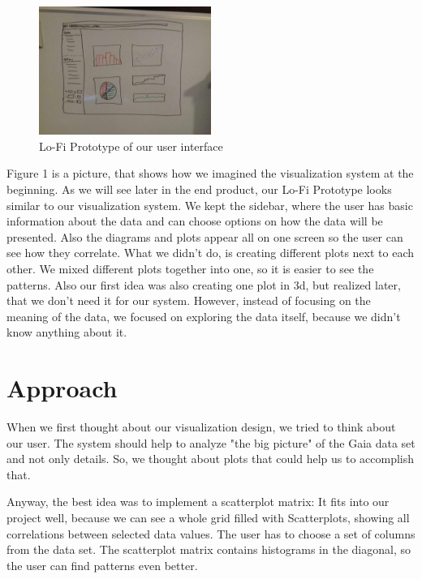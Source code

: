\documentclass{vgtc}                          %
\begin{document}
\begin{figure}[h]
\includegraphics[width=0.5\textwidth]{Prototype1.jpg}
\centering
\caption{Lo-Fi Prototype of our user interface}
\end{figure}

Figure 1 is a picture, that shows how we imagined the visualization system at the beginning.
As we will see later in the end product, our Lo-Fi Prototype looks similar to our visualization system. We kept the sidebar, where the user has basic information about the data and can choose options on how the data will be presented. Also the diagrams and plots appear all on one screen so the user can see how they correlate. What we didn't do, is creating different plots next to each other. We mixed different plots together into one, so it is easier to see the patterns. Also our first idea was also creating one plot in 3d, but realized later, that we don't need it for our system. However, instead of focusing on the meaning of the data, we focused on exploring the data itself, because we didn't know anything about it.

\section{Approach}
When we first thought about our visualization design, we tried to think about our user. The system should help to analyze "the big picture" of the Gaia data set and not only details. So, we thought about plots that could help us to accomplish that.

Anyway, the best idea was to implement a scatterplot matrix: It fits into our project well, because we can see a whole grid filled with Scatterplots, showing all correlations between selected data values.
The user has to choose a set of columns from the data set. The scatterplot matrix contains histograms in the diagonal, so the user can find patterns even better.
\end{document}

